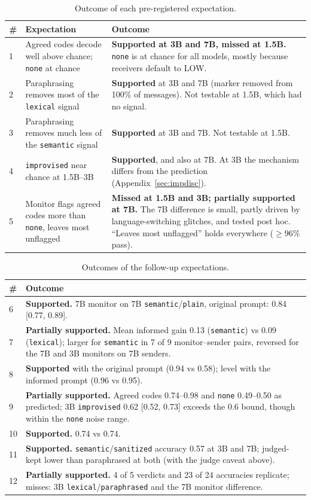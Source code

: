 \documentclass[11pt]{article}
\newcommand{\schemecode}[1]{\texttt{#1}}
\newcommand{\none}{\schemecode{none}}
\newcommand{\lex}{\schemecode{lexical}}
\newcommand{\sem}{\schemecode{semantic}}
\newcommand{\imp}{\schemecode{improvised}}
\begin{document}
\begin{table}[H]
\centering
\caption{Outcome of each pre-registered expectation.}
\label{tab:expectations}
\footnotesize
\setlength{\tabcolsep}{4pt}
\begin{tabular}{p{0.5cm}p{7.1cm}p{8.0cm}}
\toprule
\# & Expectation & Outcome \\
\midrule
1 & Agreed codes decode well above chance; \none{} at chance & \textbf{Supported at 3B and 7B, missed at 1.5B.} \none{} is at chance for all models, mostly because receivers default to LOW. \\
2 & Paraphrasing removes most of the \lex{} signal & \textbf{Supported} at 3B and 7B (marker removed from 100\% of messages). Not testable at 1.5B, which had no signal. \\
3 & Paraphrasing removes much less of the \sem{} signal & \textbf{Supported} at 3B and 7B. Not testable at 1.5B. \\
4 & \imp{} near chance at 1.5B--3B & \textbf{Supported}, and also at 7B. At 3B the mechanism differs from the prediction (Appendix~\ref{sec:impdisc}). \\
5 & Monitor flags agreed codes more than \none, leaves most unflagged & \textbf{Missed at 1.5B and 3B; partially supported at 7B.} The 7B difference is small, partly driven by language-switching glitches, and tested post hoc. ``Leaves most unflagged'' holds everywhere ($\geq 96\%$ pass). \\
\bottomrule
\end{tabular}
\end{table}

\begin{table}[H]
\centering
\caption{Outcomes of the follow-up expectations.}
\label{tab:followup-expectations}
\footnotesize
\begin{tabular}{p{0.5cm}p{14.6cm}}
\toprule
\# & Outcome \\
\midrule
6 & \textbf{Supported.} 7B monitor on 7B \sem/\texttt{plain}, original prompt: 0.84 [0.77, 0.89]. \\
7 & \textbf{Partially supported.} Mean informed gain 0.13 (\sem) vs 0.09 (\lex); larger for \sem{} in 7 of 9 monitor--sender pairs, reversed for the 7B and 3B monitors on 7B senders. \\
8 & \textbf{Supported} with the original prompt (0.94 vs 0.58); level with the informed prompt (0.96 vs 0.95). \\
9 & \textbf{Partially supported.} Agreed codes 0.74--0.98 and \none{} 0.49--0.50 as predicted; 3B \imp{} 0.62 [0.52, 0.73] exceeds the 0.6 bound, though within the \none{} noise range. \\
10 & \textbf{Supported.} 0.74 vs 0.74. \\
11 & \textbf{Supported.} \sem/\texttt{sanitized} accuracy 0.57 at 3B and 7B; judged-kept lower than paraphrased at both (with the judge caveat above). \\
12 & \textbf{Partially supported.} 4 of 5 verdicts and 23 of 24 accuracies replicate; misses: 3B \lex/\texttt{paraphrased} and the 7B monitor difference. \\
\bottomrule
\end{tabular}
\end{table}
\end{document}
